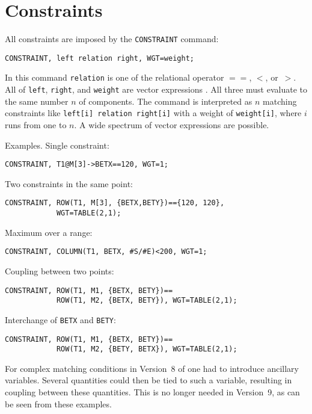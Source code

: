 \section{Constraints}
\label{sec:constraint}
All constraints are imposed by the \texttt{CONSTRAINT} command:
\begin{verbatim}
CONSTRAINT, left relation right, WGT=weight;
\end{verbatim}
In this command \texttt{relation} is one of the relational operator
$==$, $<$, or~$>$.
All of \texttt{left}, \texttt{right}, and \texttt{weight}
are vector expressions .
All three must evaluate to the same number $n$ of components.
The command is interpreted as $n$ matching constraints like
\texttt{left[i] relation right[i]} with a weight of
\texttt{weight[i]}, where $i$ runs from one to $n$.
A wide spectrum of vector expressions are possible.

Examples. Single constraint:
\begin{verbatim}
CONSTRAINT, T1@M[3]->BETX==120, WGT=1;
\end{verbatim}
Two constraints in the same point:
\begin{verbatim}
CONSTRAINT, ROW(T1, M[3], {BETX,BETY})=={120, 120},
            WGT=TABLE(2,1);
\end{verbatim}
Maximum over a range:
\begin{verbatim}
CONSTRAINT, COLUMN(T1, BETX, #S/#E)<200, WGT=1;
\end{verbatim}
Coupling between two points:
\begin{verbatim}
CONSTRAINT, ROW(T1, M1, {BETX, BETY})==
            ROW(T1, M2, {BETX, BETY}), WGT=TABLE(2,1);
\end{verbatim}
Interchange of \texttt{BETX} and \texttt{BETY}:
\begin{verbatim}
CONSTRAINT, ROW(T1, M1, {BETX, BETY})==
            ROW(T1, M2, {BETY, BETX}), WGT=TABLE(2,1);
\end{verbatim}

For complex matching conditions in Version~8 of \opal one had to
introduce ancillary variables.
Several quantities could then be tied to such a variable,
resulting in coupling between these quantities.
This is no longer needed in Version~9, as can be seen from these
examples.

